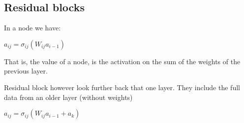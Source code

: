 
\subsection{Residual blocks}

In a node we have:

\(a_{ij}=\sigma_{ij}(W_{ij}a_{i-1})\)

That is, the value of a node, is the activation on the sum of the weights of the previous layer.

Residual block however look further back that one layer. They include the full data from an older layer (without weights)

\(a_{ij}=\sigma_{ij}(W_{ij}a_{i-1}+a_k)\)

